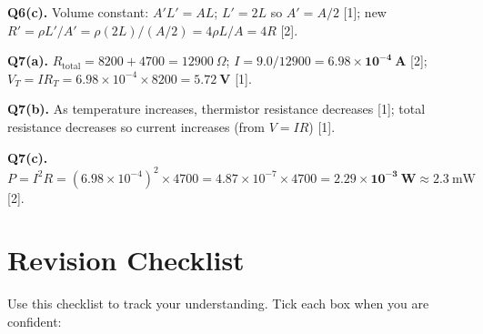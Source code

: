 \begin{markscheme}
\vspace{0.5em}\textbf{Q6(c).} Volume constant: $A'L' = AL$; $L' = 2L$ so $A' = A/2$ [1]; new $R' = \rho L'/A' = \rho(2L)/(A/2) = 4\rho L/A = 4R$ [2].

\vspace{0.5em}\textbf{Q7(a).} $R_{\text{total}} = 8200 + 4700 = 12900\ \Omega$; $I = 9.0/12900 = \mathbf{6.98\times10^{-4}\ \text{A}}$ [2]; $V_T = IR_T = 6.98\times10^{-4}\times8200 = \mathbf{5.72\ \text{V}}$ [1].

\vspace{0.5em}\textbf{Q7(b).} As temperature increases, thermistor resistance decreases [1]; total resistance decreases so current increases (from $V = IR$) [1].

\vspace{0.5em}\textbf{Q7(c).} $P = I^2R = (6.98\times10^{-4})^2 \times 4700 = 4.87\times10^{-7}\times4700 = \mathbf{2.29\times10^{-3}\ \text{W}} \approx 2.3\ \text{mW}$ [2].

\end{markscheme}

\newpage
\section{Revision Checklist}

Use this checklist to track your understanding. Tick each box when you are confident:

